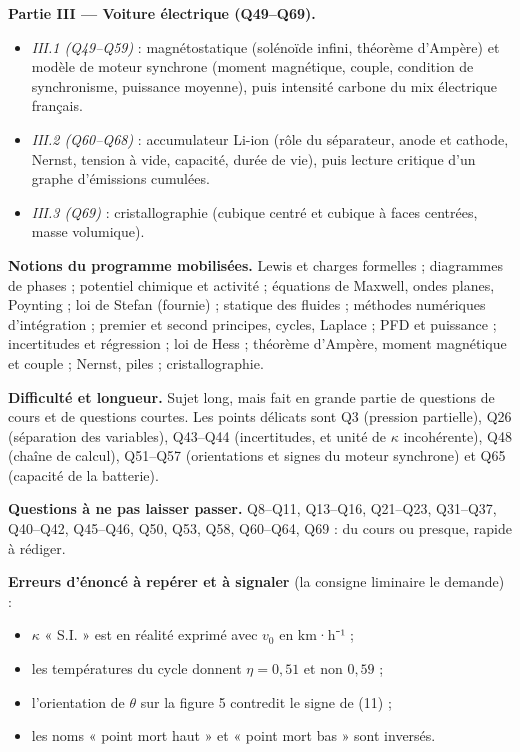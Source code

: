 \documentclass[11pt,a4paper]{article}
\providecommand{\tightlist}{\setlength{\itemsep}{0pt}\setlength{\parskip}{0pt}}
\begin{document}
\textbf{Partie III --- Voiture électrique (Q49--Q69).}

\begin{itemize}
\tightlist
\item
  \emph{III.1 (Q49--Q59)} : magnétostatique (solénoïde infini, théorème d'Ampère) et modèle de moteur synchrone (moment magnétique, couple, condition de synchronisme, puissance moyenne), puis intensité carbone du mix électrique français.
\item
  \emph{III.2 (Q60--Q68)} : accumulateur Li-ion (rôle du séparateur, anode et cathode, Nernst, tension à vide, capacité, durée de vie), puis lecture critique d'un graphe d'émissions cumulées.
\item
  \emph{III.3 (Q69)} : cristallographie (cubique centré et cubique à faces centrées, masse volumique).
\end{itemize}

\textbf{Notions du programme mobilisées.} Lewis et charges formelles ; diagrammes de phases ; potentiel chimique et activité ; équations de Maxwell, ondes planes, Poynting ; loi de Stefan (fournie) ; statique des fluides ; méthodes numériques d'intégration ; premier et second principes, cycles, Laplace ; PFD et puissance ; incertitudes et régression ; loi de Hess ; théorème d'Ampère, moment magnétique et couple ; Nernst, piles ; cristallographie.

\textbf{Difficulté et longueur.} Sujet long, mais fait en grande partie de questions de cours et de questions courtes. Les points délicats sont Q3 (pression partielle), Q26 (séparation des variables), Q43--Q44 (incertitudes, et unité de \(\kappa\) incohérente), Q48 (chaîne de calcul), Q51--Q57 (orientations et signes du moteur synchrone) et Q65 (capacité de la batterie).

\textbf{Questions à ne pas laisser passer.} Q8--Q11, Q13--Q16, Q21--Q23, Q31--Q37, Q40--Q42, Q45--Q46, Q50, Q53, Q58, Q60--Q64, Q69 : du cours ou presque, rapide à rédiger.

\textbf{Erreurs d'énoncé à repérer et à signaler} (la consigne liminaire le demande) :

\begin{itemize}
\tightlist
\item
  \(\kappa\) « S.I. » est en réalité exprimé avec \(v_0\) en km·h⁻¹ ;
\item
  les températures du cycle donnent \(\eta=0{,}51\) et non \(0{,}59\) ;
\item
  l'orientation de \(\theta\) sur la figure 5 contredit le signe de (11) ;
\item
  les noms « point mort haut » et « point mort bas » sont inversés.
\end{itemize}
\end{document}
